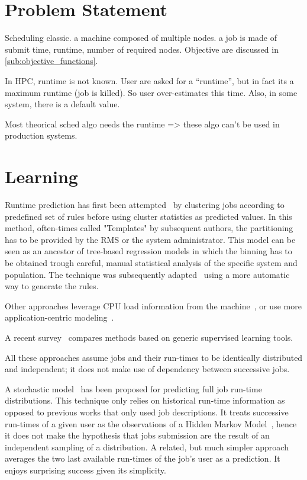 \documentclass{llncs}
\begin{document}
\section{Problem Statement}
\label{sec:problem_statement}

Scheduling classic.
a machine composed of multiple nodes.
a job is made of submit time, runtime, number of required nodes.
Objective are discussed in \ref{sub:objective_functions}.

In HPC, runtime is not known.
User are asked for a ``runtime'', but in fact its a maximum runtime (job is killed).
So user over-estimates this time.
Also, in some system, there is a default value.

Most theorical sched algo needs the runtime => these algo can't be used in production systems.


\section{Learning}
\label{sec:learning}
Runtime prediction has first been attempted~\cite{gibbons} by clustering jobs according to predefined set of rules before using cluster statistics as predicted values. In this method, often-times called "Templates" by subsequent authors, the partitioning has to be provided by the RMS or the system administrator. This model can be seen as an ancestor of tree-based regression models in which the binning has to be obtained trough careful, manual statistical analysis of the specific system and population. The technique was subsequently adapted~\cite{gibbons-GA} using a more automatic way to generate the rules.

Other approaches leverage CPU load information from the machine~\cite{predict-load}, or use more application-centric modeling~\cite{Schopf99usingstochastic}\cite{Nadeem:2009:PET:1654059.1654093}\cite{6495803}.

A recent survey~\cite{ML-predictruntime-survey} compares methods based on generic supervised learning tools.

All these approaches assume jobs and their run-times to be identically distributed and independent; it does not make use of dependency between successive jobs.

A stochastic model~\cite{hmm} has been proposed for predicting full job run-time distributions. This technique only relies on historical run-time information as opposed to previous works that only used job descriptions. It treats successive run-times of a given user as the observations of a Hidden Markov Model~\cite{rabiner}, hence it does not make the hypothesis that jobs submission are the result of an independent sampling of a distribution.
A related, but much simpler approach~\cite{tsafir} averages the two last available run-times of the job's user as a prediction. It enjoys surprising success given its simplicity.
\end{document}
